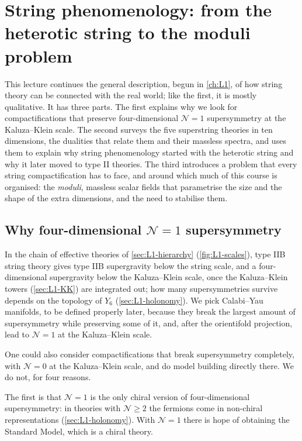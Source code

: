 \chapter{String phenomenology: from the heterotic string to the moduli problem}
\label{ch:L2}

This lecture continues the general description, begun in \cref{ch:L1}, of how string theory can be connected with the real world; like the first, it is mostly qualitative. It has three parts. The first explains why we look for compactifications that preserve four-dimensional $\mathcal N=1$ supersymmetry at the Kaluza--Klein scale. The second surveys the five superstring theories in ten dimensions, the dualities that relate them and their massless spectra, and uses them to explain why string phenomenology started with the heterotic string and why it later moved to type II theories. The third introduces a problem that every string compactification has to face, and around which much of this course is organised: the \emph{moduli}, massless scalar fields that parametrise the size and the shape of the extra dimensions, and the need to stabilise them.

\section{Why four-dimensional \texorpdfstring{$\mathcal N=1$}{N=1} supersymmetry}
\label{sec:L2-N1}

In the chain of effective theories of \cref{sec:L1-hierarchy} (\cref{fig:L1-scales}), type IIB string theory gives type IIB supergravity below the string scale, and a four-dimensional supergravity below the Kaluza--Klein scale, once the Kaluza--Klein towers (\cref{sec:L1-KK}) are integrated out; how many supersymmetries survive depends on the topology of $Y_6$ (\cref{sec:L1-holonomy}). We pick Calabi--Yau manifolds, to be defined properly later, because they break the largest amount of supersymmetry while preserving some of it, and, after the orientifold projection, lead to $\mathcal N=1$ at the Kaluza--Klein scale.

One could also consider compactifications that break supersymmetry completely, with $\mathcal N=0$ at the Kaluza--Klein scale, and do model building directly there. We do not, for four reasons.

The first is that $\mathcal N=1$ is the only chiral version of four-dimensional supersymmetry: in theories with $\mathcal N\ge2$ the fermions come in non-chiral representations (\cref{sec:L1-holonomy}). With $\mathcal N=1$ there is hope of obtaining the Standard Model, which is a chiral theory.

